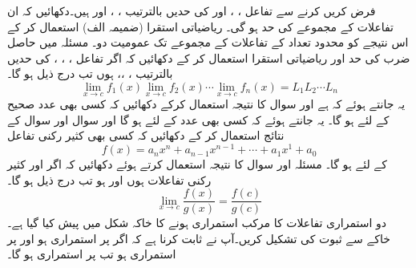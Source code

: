\setcounter{questioncounter}{0}
فرض کریں    کرنے سے تفاعل ، ، اور  کی حدیں بالترتیب ، ، اور  ہیں۔دکھائیں کہ ان تفاعلات کے مجموعے کی حد  ہو گی۔ ریاضیاتی  استقرا (ضمیمہ الف) استعمال کر کے اس نتیجے کو  محدود تعداد کے تفاعلات کے مجموعے تک عمومیت دو۔
مسئلہ    میں حاصل ضرب کی  حد   اور ریاضیاتی   استقرا استعمال  کر کے دکھائیں کہ اگر تفاعل ،   ، ،   کی  حدیں بالترتیب ،  ،،  ہوں تب درج ذیل ہو گا۔
\[\lim_{x\to c} f_1(x)\lim_{x\to c} f_2(x)\cdots \lim_{x\to c} f_n(x)=L_1 L_2\cdots L_n\]
یہ جانتے ہوئے کہ  ہے اور سوال  کا نتیجہ استعمال  کرکے دکھائیں کہ کسی بھی عدد صحیح  کے لئے  ہو گا۔
\quad 
یہ جانتے ہوئے کہ کسی بھی عدد  کے لئے  ہو گا اور سوال  اور سوال  کے نتائج استعمال کر کے دکھائیں کہ  کسی بھی کثیر رکنی تفاعل
\[f(x)=a_{n}x^{n}+a_{n-1}x^{n-1}+\cdots+a_{1}x^{1}+a_{0}\]
کے لئے  ہو گا۔
\quad 
مسئلہ   اور سوال   کا نتیجہ استعمال کرتے ہوئے دکھائیں کہ  اگر   اور  کثیر رکنی تفاعلات  ہوں اور  ہو تب درج ذیل ہو گا۔
\[\lim_{x\to c}\frac{f(x)}{g(x)}=\frac{f(c)}{g(c)}\]
\quad 
  دو استمراری تفاعلات کا  مرکب  استمراری ہونے  کا خاکہ شکل    میں پیش کیا گیا ہے۔ خاکے سے ثبوت کی   تشکیل کریں۔آپ نے ثابت کرنا ہے کہ  اگر  پر  استمراری ہو اور  پر  استمراری ہو تب  پر  استمراری ہو گا۔

